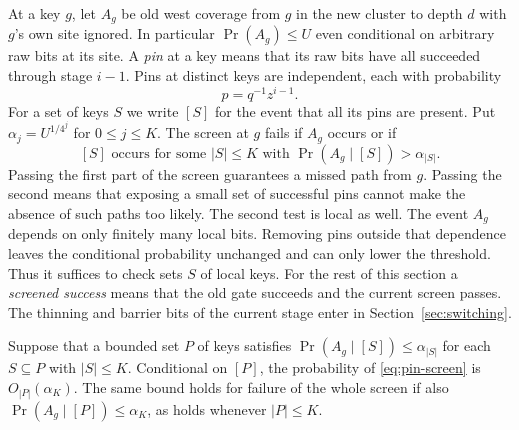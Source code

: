At a key $g$, let $A_g$ be old west coverage from $g$ in the new cluster
to depth $d$ with $g$'s own site ignored. In particular
$\Pr(A_g)\le U$ even conditional on arbitrary raw bits at its site.
A \emph{pin} at a key means that its raw bits have all succeeded through
stage $i-1$. Pins at distinct keys are independent, each with probability
\[
 p=q^{-1}z^{i-1}.
\]
For a set of keys $S$ we write $[S]$ for the event that all its pins are
present. Put $\alpha_j=U^{1/4^j}$ for $0\le j\le K$. The screen at $g$
fails if $A_g$ occurs or if
\begin{equation}\label{eq:pin-screen}
 [S]\text{ occurs for some } |S|\le K
 \text{ with }\Pr(A_g\mid [S])>\alpha_{|S|}.
\end{equation}
Passing the first part of the screen guarantees a missed path from
\(g\). Passing the second means that exposing a small set of successful
pins cannot make the absence of such paths too likely. The second test
is local as well. The event \(A_g\) depends on only finitely many local
bits. Removing pins outside that dependence leaves the conditional
probability unchanged and can only lower the threshold. Thus it
suffices to check sets \(S\) of local keys. For the rest of this
section a \emph{screened success} means that the old gate succeeds
and the current screen passes. The thinning and barrier bits of the
current stage enter in Section~\ref{sec:switching}.

\begin{lemma}\label{lem:pcost}
Suppose that a bounded set $P$ of keys satisfies
$\Pr(A_g\mid[S])\le\alpha_{|S|}$ for each $S\subseteq P$ with
$|S|\le K$. Conditional on $[P]$, the probability of
\eqref{eq:pin-screen} is $O_{|P|}(\alpha_K)$.
The same bound holds for failure of the whole screen if also
$\Pr(A_g\mid[P])\le\alpha_K$, as holds whenever $|P|\le K$.
\end{lemma}

